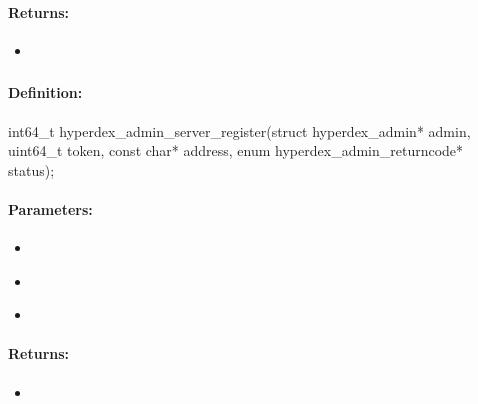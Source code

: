 \paragraph{Returns:}
\begin{itemize}[noitemsep]
\item {}\\

\end{itemize}

\pagebreak
\subsubsection{}
\label{api:c:server_register}


\paragraph{Definition:}
\begin{ccode}
int64_t hyperdex_admin_server_register(struct hyperdex_admin* admin,
        uint64_t token,
        const char* address,
        enum hyperdex_admin_returncode* status);
\end{ccode}

\paragraph{Parameters:}
\begin{itemize}[noitemsep]
\item {}\\

\item {}\\

\item {}\\

\end{itemize}

\paragraph{Returns:}
\begin{itemize}[noitemsep]
\item {}\\

\end{itemize}

